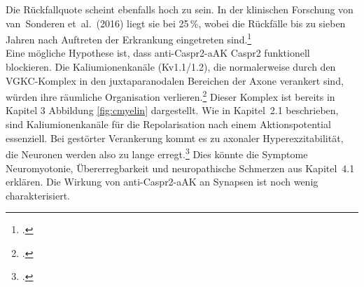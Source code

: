 Die Rückfallquote scheint ebenfalls hoch zu sein. In der klinischen
Forschung von van~Sonderen et~al.\ (2016) liegt sie bei 25\,\%, wobei die
Rückfälle bis zu sieben Jahren nach Auftreten der Erkrankung eingetreten
sind.\footcite[S.~524]{VanSonderen2016}
\\
Eine mögliche Hypothese ist, dass anti-Caspr2-aAK Caspr2 funktionell blockieren. Die Kaliumionenkanäle (Kv1.1/1.2), die normalerweise durch den VGKC-Komplex in den
juxtaparanodalen Bereichen der Axone verankert sind, würden ihre
räumliche Organisation verlieren.\footcites{Mitrevski}[S.~6--8]{Patterson2018} Dieser Komplex ist bereits in Kapitel 3 Abbildung \ref{fig:cmyelin} dargestellt. 
Wie in Kapitel~2.1 beschrieben, sind Kaliumionenkanäle für die
Repolarisation nach einem Aktionspotential essenziell. Bei gestörter
Verankerung kommt es zu axonaler Hyperexzitabilität, die Neuronen werden
also zu lange erregt.\footcite[S.~525--526]{VanSonderen2016}
Dies könnte die Symptome Neuromyotonie, Übererregbarkeit und
neuropathische Schmerzen aus Kapitel~4.1 erklären. Die Wirkung von anti-Caspr2-aAK an Synapsen ist noch wenig charakterisiert.
